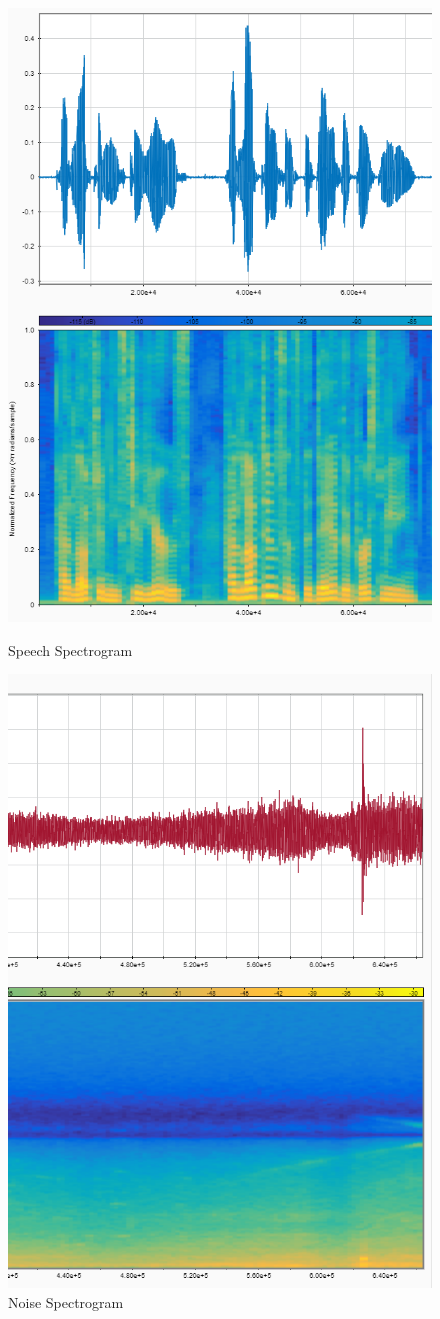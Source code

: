 \begin{figure}
\centering
\begin{minipage}{.5\textwidth}
	\centering
	\includegraphics[width=0.6\linewidth]{Illustrations/SpeechSpectrogram.PNG}
	\caption{Speech Spectrogram}
	\label{fig:SpeechSpectrogram}
\end{minipage}%
\begin{minipage}{.5\textwidth}
	\centering
	\includegraphics[width=0.6\linewidth]{Illustrations/NoiseSpectrogram.PNG}
	\caption{Noise Spectrogram}
	\label{fig:NoiseSpectrogram}
\end{minipage}
\end{figure}
\newpage

